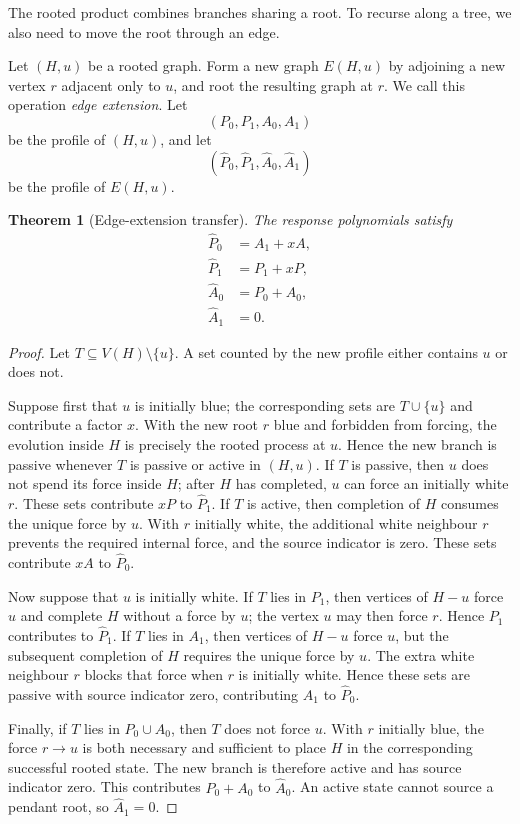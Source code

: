\documentclass[11pt,reqno]{amsart}
\newtheorem{theorem}{Theorem}[section]
\theoremstyle{definition}
\begin{document}
The rooted product combines branches sharing a root.  To recurse along a tree, we also need to move the root through an edge.

Let $(H,u)$ be a rooted graph.  Form a new graph $E(H,u)$ by adjoining a new vertex $r$ adjacent only to $u$, and root the resulting graph at $r$.  We call this operation \emph{edge extension}.  Let
\[
  (P_0,P_1,A_0,A_1)
\]
be the profile of $(H,u)$, and let
\[
  (\widehat P_0,\widehat P_1,\widehat A_0,\widehat A_1)
\]
be the profile of $E(H,u)$.

\begin{theorem}[Edge-extension transfer]\label{thm:edge-extension}
The response polynomials satisfy
\begin{align}
  \widehat P_0&=A_1+xA,\label{eq:edgeP0}\\
  \widehat P_1&=P_1+xP,\label{eq:edgeP1}\\
  \widehat A_0&=P_0+A_0,\label{eq:edgeA0}\\
  \widehat A_1&=0.\label{eq:edgeA1}
\end{align}
\end{theorem}

\begin{proof}
Let $T\subseteq V(H)\setminus\{u\}$.  A set counted by the new profile either contains $u$ or does not.

Suppose first that $u$ is initially blue; the corresponding sets are $T\cup\{u\}$ and contribute a factor $x$.  With the new root $r$ blue and forbidden from forcing, the evolution inside $H$ is precisely the rooted process at $u$.  Hence the new branch is passive whenever $T$ is passive or active in $(H,u)$.  If $T$ is passive, then $u$ does not spend its force inside $H$; after $H$ has completed, $u$ can force an initially white $r$.  These sets contribute $xP$ to $\widehat P_1$.  If $T$ is active, then completion of $H$ consumes the unique force by $u$.  With $r$ initially white, the additional white neighbour $r$ prevents the required internal force, and the source indicator is zero.  These sets contribute $xA$ to $\widehat P_0$.

Now suppose that $u$ is initially white.  If $T$ lies in $P_1$, then vertices of $H-u$ force $u$ and complete $H$ without a force by $u$; the vertex $u$ may then force $r$.  Hence $P_1$ contributes to $\widehat P_1$.  If $T$ lies in $A_1$, then vertices of $H-u$ force $u$, but the subsequent completion of $H$ requires the unique force by $u$.  The extra white neighbour $r$ blocks that force when $r$ is initially white.  Hence these sets are passive with source indicator zero, contributing $A_1$ to $\widehat P_0$.

Finally, if $T$ lies in $P_0\cup A_0$, then $T$ does not force $u$.  With $r$ initially blue, the force $r\to u$ is both necessary and sufficient to place $H$ in the corresponding successful rooted state.  The new branch is therefore active and has source indicator zero.  This contributes $P_0+A_0$ to $\widehat A_0$.  An active state cannot source a pendant root, so $\widehat A_1=0$.
\end{proof}
\end{document}
